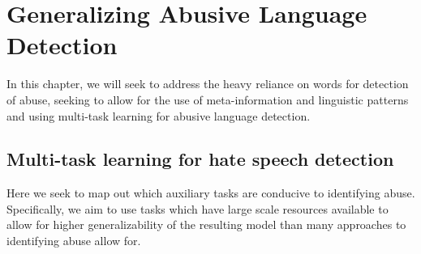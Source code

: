{%






\section{Generalizing Abusive Language Detection}
In this chapter, we will seek to address the heavy reliance on words for detection of abuse, seeking to allow for the use of meta-information and linguistic patterns and using multi-task learning for abusive language detection.

\subsection{Multi-task learning for hate speech detection}
Here we seek to map out which auxiliary tasks are conducive to identifying abuse. Specifically, we aim to use tasks which have large scale resources available to allow for higher generalizability of the resulting model than many approaches to identifying abuse allow for.

}
